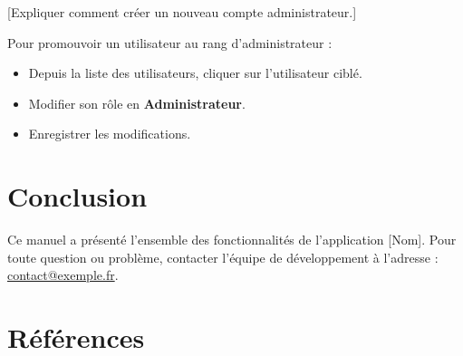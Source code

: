 \documentclass[12pt, a4paper]{article}
\begin{document}
[Expliquer comment créer un nouveau compte administrateur.]

Pour promouvoir un utilisateur au rang d'administrateur :
\begin{itemize}
  \item Depuis la liste des utilisateurs, cliquer sur l'utilisateur ciblé.
  \item Modifier son rôle en \textbf{Administrateur}.
  \item Enregistrer les modifications.
\end{itemize}

\section{Conclusion}

Ce manuel a présenté l'ensemble des fonctionnalités de l'application [Nom].
Pour toute question ou problème, contacter l'équipe de développement à
l'adresse : \href{mailto:contact@exemple.fr}{contact@exemple.fr}.

\section{Références}

\printbibliography[heading=none]
\end{document}
